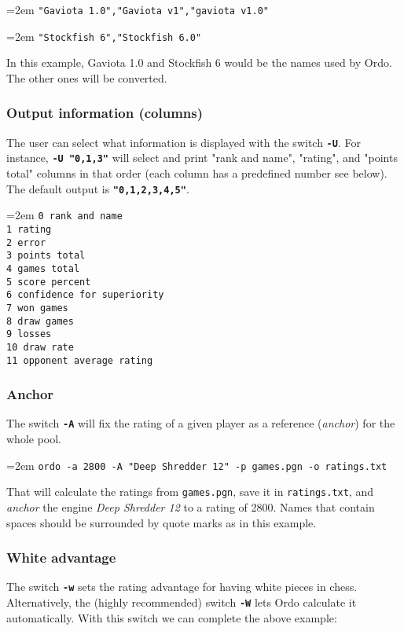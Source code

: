 \documentclass[12pt]{article}
\newcommand{\swtch} [1] {\texttt{\textbf{#1}}}
\newcommand{\filename} [1] {\texttt{#1}}
\newcommand{\cmdln}[1]{
	\par
	\begingroup
		\leftskip=2em
		\addtolength{\rightskip}{0em}
		\noindent \small{\texttt{#1}}
		\par
	\endgroup
}
\begin{document}
	\cmdln{"Gaviota 1.0","Gaviota v1","gaviota v1.0"}
	\cmdln{"Stockfish 6","Stockfish 6.0"}

In this example, Gaviota 1.0 and Stockfish 6 would be the names used by Ordo.
The other ones will be converted.

\subsubsection*{Output information (columns)}
The user can select what information is displayed with the switch \swtch{-U}.
For instance, \swtch{-U "0,1,3"} will select and print "rank and name", "rating", and "points total" columns in that order (each column has a predefined number see below). 
The default output is \swtch{"0,1,2,3,4,5"}.

\cmdln{0 rank and name\\
 1 rating\\
 2 error\\
 3 points total\\
 4 games total\\
 5 score percent\\
 6 confidence for superiority\\
 7 won games\\
 8 draw games\\
 9 losses\\
10 draw rate\\
11 opponent average rating}

\subsubsection*{Anchor}
The switch \swtch{-A} will fix the rating of a given player as a reference (\textit{anchor}) for the whole pool.

	\cmdln{ordo -a 2800 -A "Deep Shredder 12" -p games.pgn -o ratings.txt}

That will calculate the ratings from \filename{games.pgn}, save it in \filename{ratings.txt}, and \textit{anchor} the engine \textit{Deep Shredder 12} to a rating of 2800.
Names that contain spaces should be surrounded by quote marks as in this example.

\subsubsection*{White advantage}
The switch \swtch{-w} sets the rating advantage for having white pieces in chess. 
Alternatively, the (highly recommended) switch \swtch{-W} lets Ordo calculate it automatically. 
With this switch we can complete the above example:
\end{document}
